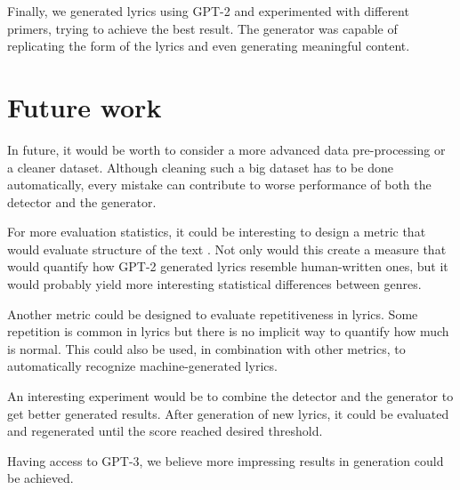 Finally, we generated lyrics using GPT-2 and experimented with different primers, trying to achieve the best result. The generator was capable of replicating the form of the lyrics and even generating meaningful content. 

\section*{Future work}
In future, it would be worth to consider a more advanced data pre-processing or a cleaner dataset. Although cleaning such a big dataset has to be done automatically, every mistake can contribute to worse performance of both the detector and the generator.

For more evaluation statistics, it could be interesting to design a metric that would evaluate structure of the text . Not only would this create a measure that would quantify how GPT-2 generated lyrics resemble human-written ones, but it would probably yield more interesting statistical differences between genres.

Another metric could be designed to evaluate repetitiveness in lyrics. Some repetition is common in lyrics but there is no implicit way to quantify how much is normal. This could also be used, in combination with other metrics, to automatically recognize machine-generated lyrics.

An interesting experiment would be to combine the detector and the generator to get better generated results. After generation of new lyrics, it could be evaluated and regenerated until the score reached  desired threshold.

Having access to GPT-3, we believe more impressing results in generation could be achieved.
